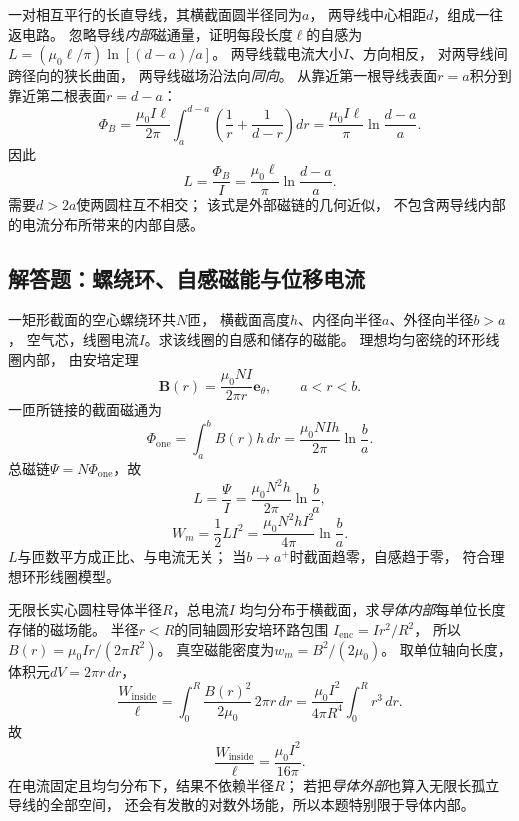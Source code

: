 \problemtext 一对相互平行的长直导线，其横截面圆半径同为$a$，
两导线中心相距$d$，组成一往返电路。
忽略导线\emph{内部}磁通量，证明每段长度$\ell$的自感为
$L=(\mu_0\ell/\pi)\ln[(d-a)/a]$。
\workings
两导线载电流大小$I$、方向相反，
对两导线间跨径向的狭长曲面，
两导线磁场沿法向\emph{同向}。
从靠近第一根导线表面$r=a$积分到
靠近第二根表面$r=d-a$：
\[
\Phi_B=\frac{\mu_0 I\ell}{2\pi}
\int_a^{d-a}\left(\frac1r+\frac1{d-r}\right)dr
=\frac{\mu_0I\ell}{\pi}\ln\frac{d-a}{a}.
\]
因此
\[
\boxed{L=\frac{\Phi_B}{I}
=\frac{\mu_0\ell}{\pi}\ln\frac{d-a}{a}}.
\]
\crosscheck 需要$d>2a$使两圆柱互不相交；
该式是外部磁链的几何近似，
不包含两导线内部的电流分布所带来的内部自感。


\subsection{解答题：螺绕环、自感磁能与位移电流}

\problemtext 一矩形截面的空心螺绕环共$N$匝，
横截面高度$h$、内径向半径$a$、外径向半径$b>a$，
空气芯，线圈电流$I$。求该线圈的自感和储存的磁能。
\workings
理想均匀密绕的环形线圈内部，
由安培定理
\[
\bm B(r)=\frac{\mu_0NI}{2\pi r}\bm e_\theta,
\qquad a<r<b.
\]
一匝所链接的截面磁通为
\[
\Phi_{\mathrm{one}}=\int_a^b B(r)h\,dr
=\frac{\mu_0NIh}{2\pi}\ln\frac ba.
\]
总磁链$\Psi=N\Phi_{\mathrm{one}}$，故
\[
\boxed{L=\frac{\Psi}{I}
=\frac{\mu_0N^2h}{2\pi}\ln\frac ba},
\]
\[
\boxed{W_m=\frac12 LI^2
=\frac{\mu_0N^2hI^2}{4\pi}\ln\frac ba}.
\]
\crosscheck $L$与匝数平方成正比、与电流无关；
当$b\to a^+$时截面趋零，自感趋于零，
符合理想环形线圈模型。

\problemtext 无限长实心圆柱导体半径$R$，总电流$I$
均匀分布于横截面，求\emph{导体内部}每单位长度存储的磁场能。
\workings
半径$r<R$的同轴圆形安培环路包围
$I_{\mathrm{enc}}=I r^2/R^2$，
所以
$B(r)=\mu_0Ir/(2\pi R^2)$。
真空磁能密度为$w_m=B^2/(2\mu_0)$。
取单位轴向长度，体积元$dV=2\pi r\,dr$，
\[
\frac{W_{\mathrm{inside}}}{\ell}
=\int_0^R\frac{B(r)^2}{2\mu_0}\,2\pi r\,dr
=\frac{\mu_0I^2}{4\pi R^4}\int_0^Rr^3\,dr.
\]
故
\[
\boxed{\frac{W_{\mathrm{inside}}}{\ell}
=\frac{\mu_0I^2}{16\pi}}.
\]
\crosscheck 在电流固定且均匀分布下，结果不依赖半径$R$；
若把\emph{导体外部}也算入无限长孤立导线的全部空间，
还会有发散的对数外场能，所以本题特别限于导体内部。

